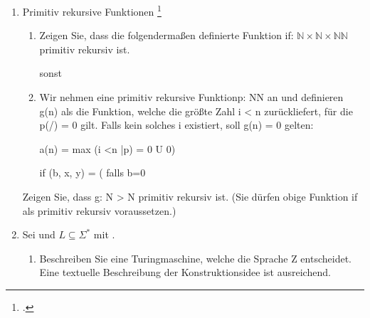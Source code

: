 \documentclass{bschlangaul-aufgabe}
\begin{document}

\begin{enumerate}


\item Primitiv rekursive Funktionen
\footcite{examen:66115:2017:03}

\begin{enumerate}


\item Zeigen Sie, dass die folgendermaßen definierte Funktion
if: $\mathbb{N} \times \mathbb{N} \times \mathbb{N}
\mathbb{N}$ primitiv rekursiv ist.

sonst


\item Wir nehmen eine primitiv rekursive Funktionp: NN an und definieren
g(n) als die Funktion, welche die größte Zahl i < n zurückliefert, für
die p(/) = 0 gilt. Falls kein solches i existiert, soll g(n) = 0 gelten:

a(n) = max ({i <n |p) = 0} U {0})

if (b, x, y) = ( falls b=0
\end{enumerate}

Zeigen Sie, dass g: N > N primitiv rekursiv ist. (Sie dürfen obige
Funktion if als primitiv rekursiv voraussetzen.)


\item Sei  und $L \subseteq \Sigma^*$ mit
.
\begin{enumerate}


\item Beschreiben Sie eine Turingmaschine, welche die Sprache Z
entscheidet. Eine textuelle Beschreibung der Konstruktionsidee ist
ausreichend.

\begin{bAntwort}
\begin{center}
\end{center}
\end{bAntwort}
\end{enumerate}
\end{enumerate}
\end{document}
